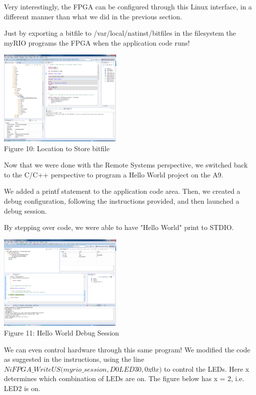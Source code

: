 \documentclass[twoside]{article}
\begin{document}
\begin{multicols}{2}
Very interestingly, the FPGA can be configured through this Linux interface, in a different manner than what we did in the previous section.

Just by exporting a bitfile to /var/local/natinst/bitfiles in the filesystem the myRIO  programs the FPGA when the application code runs!

\begin{center}
\includegraphics*[width = 6cm]{Fig10.png}\\
Figure 10: Location to Store bitfile
\end{center}


Now that we were done with the Remote Systems perspective, we switched back to the C/C++ perspective to program a Hello World project on the A9.

We added a printf statement to the application code area. Then, we created a debug configuration, following the instructions provided, and then launched a debug session. 

By stepping over code, we were able to have "Hello World" print to STDIO.

\begin{center}
\includegraphics*[width = 6cm]{Fig11.png}\\
Figure 11: Hello World Debug Session 
\end{center}

We can even control hardware through this same program! We modified the code as suggested in the instructions, using the line $NiFPGA\_WriteUS(myrio\_session, D0LED30, 0$x$0x)$ to control the LEDs. Here x determines which combination of LEDs are on. The figure below has x = 2, i.e. LED2 is on. 


\end{multicols}
\end{document}
